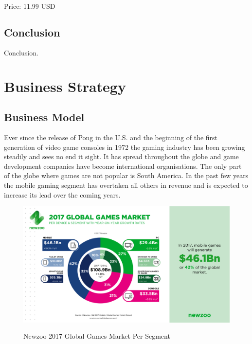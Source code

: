 \documentclass[12p]{article}
\begin{document}
Price: 11.99 USD


\subsection{Conclusion}
Conclusion.


\newpage
\section{Business Strategy} \label{MarketAnalysis}


\subsection{Business Model} 
Ever since the release of Pong\cite{Pong} in the U.S. and the beginning of the first generation of video game consoles in 1972 the gaming industry has been growing steadily and sees no end it sight. It has spread throughout the globe and game development companies have become international organisations. The only part of the globe where games are not popular is South America.\cite{GamesMarketRevenue} In the past few years the mobile gaming segment has overtaken all others in revenue and is expected to increase its lead over the coming years.

\begin{figure}[ht]
  \center
  \includegraphics[width=1\textwidth]{BusinessStrategy/Newzoo_2017_Global_Games_Market_Per_Segment_April_2017}
  \label{Newzoo_2017_Global_Games_Market_Per_Segment_April_2017}
  \caption{Newzoo 2017 Global Games Market Per Segment \cite{NezooScreenshot}}
\end{figure}
\end{document}

